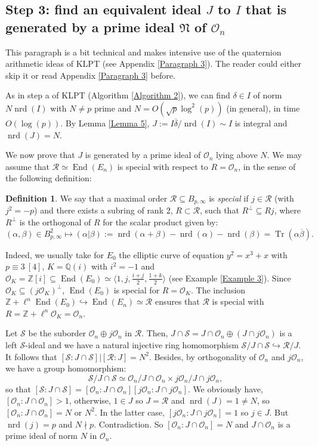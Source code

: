 \documentclass[a4paper,10pt,notitlepage]{report}
\theoremstyle{definition}
\newtheorem{Definition}{Definition}[chapter]
\theoremstyle{plain}
\theoremstyle{definition}
\newcommand{\Z}{\mathbb{Z}}
\newcommand{\Q}{\mathbb{Q}}
\newcommand{\m}[1]{\mathcal{#1}}
\newcommand{\mO}{\mathcal{O}}
\renewcommand{\(}{\left(}
\renewcommand{\)}{\right)}
\newcommand{\mf}[1]{\mathfrak{#1}}
\DeclareMathOperator{\End}{End}
\DeclareMathOperator{\Tr}{Tr}
\DeclareMathOperator{\nrd}{nrd}
\begin{document}
\subsection{Step 3: find an equivalent ideal $J$ to $I$ that is generated by a prime ideal $\mf{N}$ of $\mO_n$}

This paragraph is a bit technical and makes intensive use of the quaternion arithmetic ideas of KLPT (see Appendix \ref{Paragraph 3}). The reader could either skip it or read Appendix \ref{Paragraph 3} before.

As in step a of KLPT (Algorithm \ref{Algorithm 2}), we can find $\delta\in I$ of norm $N\nrd(I)$ with $N\neq p$ prime and $N=O(\sqrt{p}\log^2(p))$ (in general), in time $O(\log(p))$. By Lemma \ref{Lemma 5}, $J:=I\overline{\delta}/\nrd(I)\sim I$ is integral and $\nrd(J)=N$.

We now prove that $J$ is generated by a prime ideal of $\mO_n$ lying above $N$. We may assume that $\m{R}\simeq\End(E_n)$ is special with respect to $R=\mO_n$, in the sense of the following definition:

\begin{Definition}
We say that a maximal order $\m{R}\subseteq B_{p,\infty}$ is \emph{special} if $j\in \m{R}$ (with $j^2=-p$) and there exists a subring of rank $2$, $R\subset\m{R}$, such that $R^\bot\subseteq Rj$, where $R^\bot$ is the orthogonal of $R$ for the scalar product given by:
\[(\alpha,\beta)\in B_{p,\infty}^2\longmapsto (\alpha|\beta):=\nrd(\alpha+\beta)-\nrd(\alpha)-\nrd(\beta)=\Tr(\alpha\overline{\beta}).\]
\end{Definition}

Indeed,  we usually take for $E_0$ the elliptic curve of equation $y^2=x^3+x$ with $p\equiv 3 \ [4]$, $K=\Q(i)$ with $i^2=-1$ and $\mO_K=\Z[i]\subseteq \End(E_0)\simeq \langle 1,j, \frac{i+j}{2},\frac{1+k}{2}\rangle$ (see Example \ref{Example 3}). Since $\mO_K\subseteq (j\mO_K)^\bot$, $\End(E_0)$ is special for $R=\mO_K$. The inclusion $\Z+\ell^n\End(E_0)\hookrightarrow \End(E_n)\simeq \m{R}$ ensures that $\m{R}$ is special with $R=\Z+\ell^n\mO_K=\mO_n$.

Let $\m{S}$ be the suborder $\mO_n\oplus j\mO_n$ in $\m{R}$. Then, $J\cap\m{S}=J\cap\mO_n\oplus(J\cap j\mO_n)$ is a left $\m{S}$-ideal and we have a natural injective ring homomorphism $\m{S}/J\cap\m{S}\hookrightarrow \m{R}/J$. It follows that $[\m{S}:J\cap\m{S}]|[\m{R}:J]=N^2$. Besides, by orthogonality of $\mO_n$ and $j\mO_n$, we have a group homomorphism: 
\[\m{S}/J\cap\m{S}\simeq \mO_n/J\cap\mO_n\times j\mO_n/J\cap j\mO_n,\]
so that $[\m{S}:J\cap\m{S}]=[\mO_n:J\cap\mO_n][j\mO_n:J\cap j\mO_n]$. We obviously have, $[\mO_n:J\cap\mO_n]>1$, otherwise, $1\in J$ so $J=\m{R}$ and $\nrd(J)=1\neq N$, so $[\mO_n:J\cap\mO_n]=N$ or $N^2$. In the latter case, $[j\mO_n:J\cap j\mO_n]=1$ so $j\in J$. But $\nrd(j)=p$ and $N\nmid p$. Contradiction.  So $[\mO_n:J\cap\mO_n]=N$ and $J\cap\mO_n$ is a prime ideal of norm $N$ in $\mO_n$.
\end{document}
